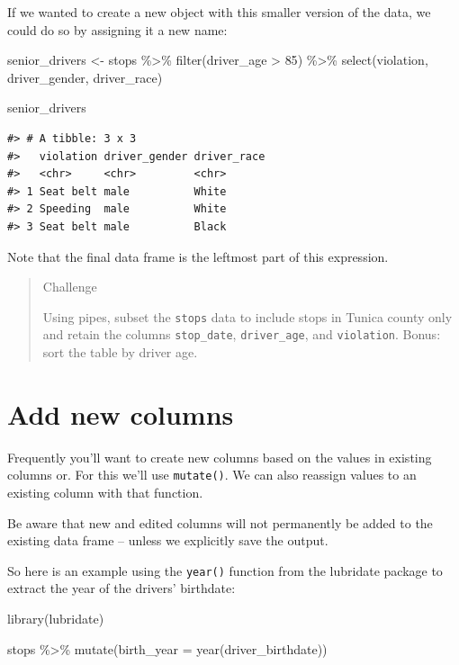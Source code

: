 \documentclass[
]{book}
\newenvironment{Shaded}{\begin{snugshade}}{\end{snugshade}}
\newcommand{\AttributeTok}[1]{\textcolor[rgb]{0.77,0.63,0.00}{#1}}
\newcommand{\DecValTok}[1]{\textcolor[rgb]{0.00,0.00,0.81}{#1}}
\newcommand{\FunctionTok}[1]{\textcolor[rgb]{0.00,0.00,0.00}{#1}}
\newcommand{\NormalTok}[1]{#1}
\newcommand{\OtherTok}[1]{\textcolor[rgb]{0.56,0.35,0.01}{#1}}
\newcommand{\SpecialCharTok}[1]{\textcolor[rgb]{0.00,0.00,0.00}{#1}}
\begin{document}
If we wanted to create a new object with this smaller version of the data, we
could do so by assigning it a new name:

\begin{Shaded}
\begin{Highlighting}[]
\NormalTok{senior\_drivers }\OtherTok{\textless{}{-}}\NormalTok{ stops }\SpecialCharTok{\%\textgreater{}\%}
  \FunctionTok{filter}\NormalTok{(driver\_age }\SpecialCharTok{\textgreater{}} \DecValTok{85}\NormalTok{) }\SpecialCharTok{\%\textgreater{}\%}
  \FunctionTok{select}\NormalTok{(violation, driver\_gender, driver\_race)}

\NormalTok{senior\_drivers}
\end{Highlighting}
\end{Shaded}

\begin{verbatim}
#> # A tibble: 3 x 3
#>   violation driver_gender driver_race
#>   <chr>     <chr>         <chr>      
#> 1 Seat belt male          White      
#> 2 Speeding  male          White      
#> 3 Seat belt male          Black
\end{verbatim}

Note that the final data frame is the leftmost part of this expression.

\begin{quote}
Challenge

Using pipes, subset the \texttt{stops} data to include stops in Tunica county only and retain the columns \texttt{stop\_date}, \texttt{driver\_age}, and \texttt{violation}. Bonus: sort the table by driver age.
\end{quote}

\hypertarget{add-new-columns}{%
\section{Add new columns}\label{add-new-columns}}

Frequently you'll want to create new columns based on the values in existing columns or. For this we'll use \texttt{mutate()}. We can also reassign values to an existing column with that function.

Be aware that new and edited columns will not permanently be added to the existing data frame -- unless we explicitly save the output.

So here is an example using the \texttt{year()} function from the lubridate package to extract the year of the drivers' birthdate:

\begin{Shaded}
\begin{Highlighting}[]
\FunctionTok{library}\NormalTok{(lubridate)}

\NormalTok{stops }\SpecialCharTok{\%\textgreater{}\%} 
  \FunctionTok{mutate}\NormalTok{(}\AttributeTok{birth\_year =} \FunctionTok{year}\NormalTok{(driver\_birthdate))}
\end{Highlighting}
\end{Shaded}
\end{document}
